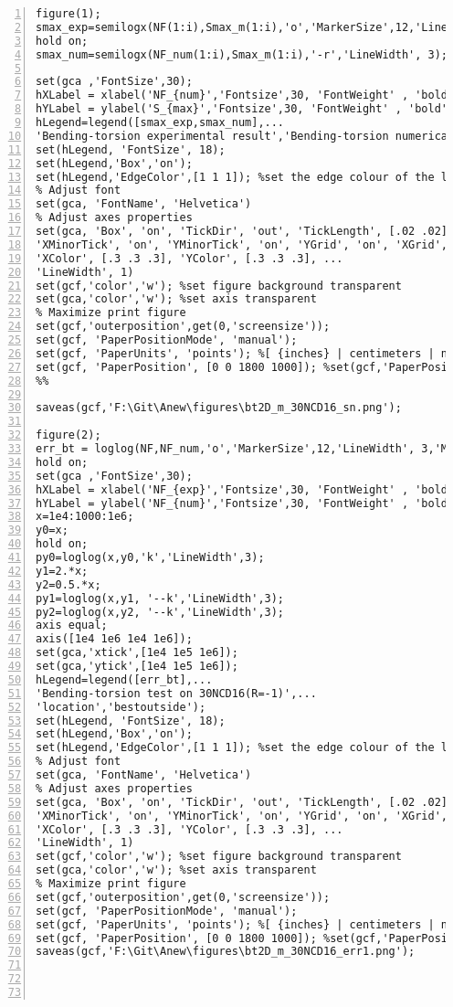 \begin{lstlisting}[numbers=left, numberstyle=\tiny, keywordstyle=\color{blue!100}, commentstyle=\color{red!30!green!100!blue!100}, frame=shadowbox, rulesepcolor=\color{red!20!green!20!blue!20}]
figure(1);
smax_exp=semilogx(NF(1:i),Smax_m(1:i),'o','MarkerSize',12,'LineWidth', 3,'MarkerEdgeColor',[208 32 144]/255, 'MarkerFaceColor','none');
hold on;
smax_num=semilogx(NF_num(1:i),Smax_m(1:i),'-r','LineWidth', 3);

set(gca ,'FontSize',30);
hXLabel = xlabel('NF_{num}','Fontsize',30, 'FontWeight' , 'bold');
hYLabel = ylabel('S_{max}','Fontsize',30, 'FontWeight' , 'bold');
hLegend=legend([smax_exp,smax_num],...
'Bending-torsion experimental result','Bending-torsion numerical result','location','bestoutside');
set(hLegend, 'FontSize', 18);
set(hLegend,'Box','on');
set(hLegend,'EdgeColor',[1 1 1]); %set the edge colour of the legend to white 
% Adjust font
set(gca, 'FontName', 'Helvetica')
% Adjust axes properties
set(gca, 'Box', 'on', 'TickDir', 'out', 'TickLength', [.02 .02], ...
'XMinorTick', 'on', 'YMinorTick', 'on', 'YGrid', 'on', 'XGrid', 'on',...
'XColor', [.3 .3 .3], 'YColor', [.3 .3 .3], ...
'LineWidth', 1)
set(gcf,'color','w'); %set figure background transparent
set(gca,'color','w'); %set axis transparent
% Maximize print figure
set(gcf,'outerposition',get(0,'screensize'));
set(gcf, 'PaperPositionMode', 'manual');
set(gcf, 'PaperUnits', 'points'); %[ {inches} | centimeters | normalized | points ]
set(gcf, 'PaperPosition', [0 0 1800 1000]); %set(gcf,'PaperPosition',[left,bottom,width,height])
%% 

saveas(gcf,'F:\Git\Anew\figures\bt2D_m_30NCD16_sn.png');

figure(2);
err_bt = loglog(NF,NF_num,'o','MarkerSize',12,'LineWidth', 3,'MarkerEdgeColor',[	139 69 19]/255, 'MarkerFaceColor','none');
hold on;
set(gca ,'FontSize',30);
hXLabel = xlabel('NF_{exp}','Fontsize',30, 'FontWeight' , 'bold');
hYLabel = ylabel('NF_{num}','Fontsize',30, 'FontWeight' , 'bold');
x=1e4:1000:1e6;
y0=x;
hold on;
py0=loglog(x,y0,'k','LineWidth',3);
y1=2.*x;
y2=0.5.*x;
py1=loglog(x,y1, '--k','LineWidth',3);
py2=loglog(x,y2, '--k','LineWidth',3);
axis equal;
axis([1e4 1e6 1e4 1e6]);
set(gca,'xtick',[1e4 1e5 1e6]); 
set(gca,'ytick',[1e4 1e5 1e6]); 
hLegend=legend([err_bt],...
'Bending-torsion test on 30NCD16(R=-1)',...
'location','bestoutside');
set(hLegend, 'FontSize', 18);
set(hLegend,'Box','on');
set(hLegend,'EdgeColor',[1 1 1]); %set the edge colour of the legend to white 
% Adjust font
set(gca, 'FontName', 'Helvetica')
% Adjust axes properties
set(gca, 'Box', 'on', 'TickDir', 'out', 'TickLength', [.02 .02], ...
'XMinorTick', 'on', 'YMinorTick', 'on', 'YGrid', 'on', 'XGrid', 'on',...
'XColor', [.3 .3 .3], 'YColor', [.3 .3 .3], ...
'LineWidth', 1)
set(gcf,'color','w'); %set figure background transparent
set(gca,'color','w'); %set axis transparent
% Maximize print figure
set(gcf,'outerposition',get(0,'screensize'));
set(gcf, 'PaperPositionMode', 'manual');
set(gcf, 'PaperUnits', 'points'); %[ {inches} | centimeters | normalized | points ]
set(gcf, 'PaperPosition', [0 0 1800 1000]); %set(gcf,'PaperPosition',[left,bottom,width,height])
saveas(gcf,'F:\Git\Anew\figures\bt2D_m_30NCD16_err1.png');




\end{lstlisting}
